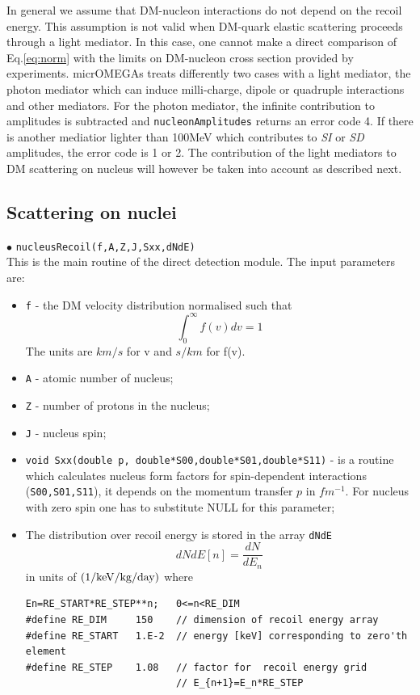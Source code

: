\documentclass[12pt,a4paper]{article}
\begin{document}
 In general we assume that DM-nucleon interactions do not depend on the recoil energy. This assumption is not valid when  DM-quark elastic scattering proceeds through a  light mediator. In this case, one cannot make a  direct comparison of  Eq.\ref{eq:norm}  with the  limits  on DM-nucleon cross section provided by experiments.  micrOMEGAs treats differently  two cases with a  light mediator,  the photon mediator which can induce milli-charge, dipole or quadruple interactions and  other mediators. For the photon mediator, the infinite contribution  to amplitudes  is subtracted  and  {\tt nucleonAmplitudes} returns an error code 4. If there is another  mediatior lighter than 100MeV which contributes to {\it SI} or {\it SD}  amplitudes, the error code is 1 or 2. The contribution of the light mediators to DM scattering on nucleus will however be taken into account as described next. 
 



\subsection{Scattering on nuclei}
\label{DDforNucleus}
$\bullet$ \verb|nucleusRecoil(f,A,Z,J,Sxx,dNdE)|\\
This is the main routine of the  direct detection module. The
input parameters are:
\begin{itemize}
\item[$\diamond$]
\verb|f| -  the DM velocity distribution   normalised such that 
\begin{equation}
\label{v_norm} 
\int_0^{\infty} f(v) dv =1
\end{equation} 
The units  are $km/s$ for v and $s/km$ for  f(v).
\item[$\diamond$]
\verb|A| - atomic number of nucleus;
\item[$\diamond$]
\verb|Z| - number of protons in the nucleus;%
\item[$\diamond$]
\verb|J| - nucleus spin;%
\item[$\diamond$]
\verb|void Sxx(double p, double*S00,double*S01,double*S11)| - is a routine which calculates nucleus form factors for
spin-dependent interactions (\verb|S00,S01,S11|), it depends  on the momentum
transfer $p$  in $fm^{-1}$. For nucleus with zero spin one has to substitute NULL for this parameter;

\item[$\diamond$] The distribution over recoil energy is stored in the array 
\verb|dNdE| 
$$
   dNdE[n] = \frac{dN}{dE_n}
$$
in units of ${\rm (1/keV/kg/day)}$ where 
\begin{verbatim}
En=RE_START*RE_STEP**n;   0<=n<RE_DIM
#define RE_DIM     150    // dimension of recoil energy array
#define RE_START   1.E-2  // energy [keV] corresponding to zero'th element 
#define RE_STEP    1.08   // factor for  recoil energy grid  
                          // E_{n+1}=E_n*RE_STEP 
\end{verbatim}

\end{itemize}
\end{document}
